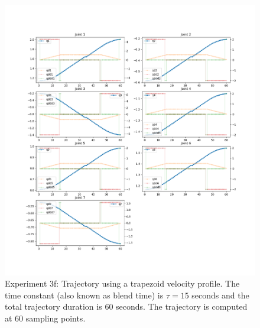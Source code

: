 \begin{center}
\begin{figure}[H]
\centering
\includegraphics[width=\textwidth]{images/robot_planner3/3f_trapezoid1.png}
\caption{Experiment 3f: Trajectory using a trapezoid velocity profile. The time constant (also known as blend time) is $τ = 15$ seconds and the total trajectory duration is 60 seconds. The trajectory is computed at 60 sampling points.}
\label{robot-planner3f-joint-trapezoid1}
\end{figure}
\end{center}

